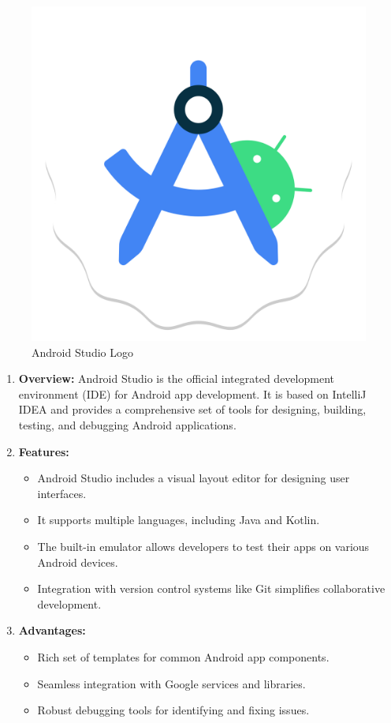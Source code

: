 \documentclass[11pt]{article}
\begin{document}
\begin{figure}[H]
    \centering
    \includegraphics[width=.45\textwidth]{android studio/android studio_0.jpg}
    \caption{Android Studio Logo}
\end{figure}
\begin{enumerate}
    \item \textbf{Overview:} Android Studio is the official integrated development environment (IDE) for Android app development. It is based on IntelliJ IDEA and provides a comprehensive set of tools for designing, building, testing, and debugging Android applications.

    \item \textbf{Features:}
          \begin{itemize}
              \item Android Studio includes a visual layout editor for designing user interfaces.
              \item It supports multiple languages, including Java and Kotlin.
              \item The built-in emulator allows developers to test their apps on various Android
                    devices.
              \item Integration with version control systems like Git simplifies collaborative
                    development.
          \end{itemize}

    \item \textbf{Advantages:}
          \begin{itemize}
              \item Rich set of templates for common Android app components.
              \item Seamless integration with Google services and libraries.
              \item Robust debugging tools for identifying and fixing issues.
          \end{itemize}


\end{enumerate}
\end{document}

